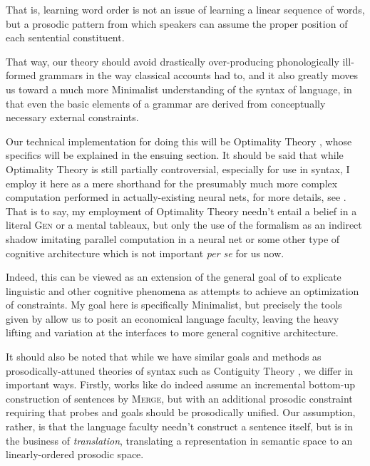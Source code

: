 \documentclass{article}
\begin{document}
That is, learning word order is not an issue of learning a linear sequence of words, but a prosodic pattern from which speakers can assume the proper position of each sentential constituent.

That way, our theory should avoid drastically over-producing phonologically ill-formed grammars in the way classical accounts had to, and it also greatly moves us toward a much more Minimalist understanding of the syntax of language, in that even the basic elements of a grammar are derived from conceptually necessary external constraints.

Our technical implementation for doing this will be Optimality Theory \parencite{prince93}, whose specifics will be explained in the ensuing section.
It should be said that while Optimality Theory is still partially controversial, especially for use in syntax, I employ it here as a mere shorthand for the presumably much more complex computation performed in actually-existing neural nets, for more details, see \textcite{prince97}.
That is to say, my employment of Optimality Theory needn't entail a belief in a literal {\textsc{Gen}} or a mental tableaux, but only the use of the formalism as an indirect shadow imitating parallel computation in a neural net or some other type of cognitive architecture which is not important \textit{per se} for us now.

Indeed, this can be viewed as an extension of the general goal of \textcite{smolensky06} to explicate linguistic and other cognitive phenomena as attempts to achieve an optimization of constraints.
My goal here is specifically Minimalist, but precisely the tools given by \textcite{smolensky06} allow us to posit an economical language faculty, leaving the heavy lifting and variation at the interfaces to more general cognitive architecture.

It should also be noted that while we have similar goals and methods as prosodically-attuned theories of syntax such as Contiguity Theory \parencite{richards16}, we differ in important ways.
Firstly, works like \textcite{richards10,richards16} do indeed assume an incremental bottom-up construction of sentences by \textsc{Merge}, but with an additional prosodic constraint requiring that probes and goals should be prosodically unified.
Our assumption, rather, is that the language faculty needn't construct a sentence itself, but is in the business of \textit{translation}, translating a representation in semantic space to an linearly-ordered prosodic space.
\end{document}
